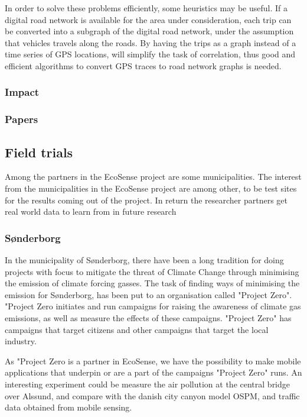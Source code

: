 In order to solve these problems efficiently, some heuristics may be useful. If a digital road network is available for the area under consideration, each trip can be converted into a subgraph of the  digital road network, under the assumption that vehicles travels along the roads. By having the trips as a graph instead of a time series of GPS locations, will simplify the task of correlation, thus good and efficient algorithms to convert GPS traces to road network graphs is needed.
\subsubsection{Impact}

\subsubsection{Papers}
\subsection{Field trials}
Among the partners in the EcoSense project are some municipalities. The interest from the municipalities in the EcoSense project are among other, to be test sites for the results coming out of the project. In return the researcher partners get real world data to learn from in future research
\subsubsection{S\o nderborg}
In the municipality of S\o nderborg, there have been a long tradition for doing projects with focus to mitigate the threat of Climate Change through minimising the emission of climate forcing gasses. The task of finding ways of minimising the emission for S\o nderborg, has been put to an organisation called "Project Zero". "Project Zero initiates and run campaigns for raising the awareness of climate gas emissions, as well as measure the effects of these campaigns. "Project Zero" has campaigns that target citizens and other campaigns that target the local industry.

As "Project Zero is a partner in EcoSense, we have the possibility to make mobile applications that underpin or are a part of the campaigns "Project Zero" runs. An interesting experiment could be measure the air pollution at the central bridge over Alssund, and compare with the danish city canyon model OSPM, and traffic data obtained from mobile sensing.

